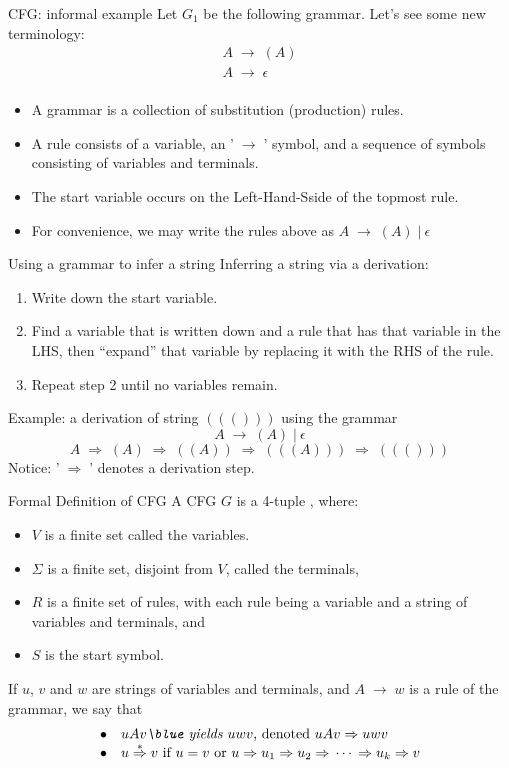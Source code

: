 \documentclass{prosper}%
\newcommand{\ra}{\mbox{$\;\rightarrow\;$}}
\newcommand{\vb}{\mbox{$\;|\:$}}
\newcommand{\dra}{\mbox{$\;\Rightarrow\;$}}
\newcommand{\cdra}{\mbox{$\;\stackrel{*}{\Rightarrow}\;$}}
\begin{document}
\begin{slide}{CFG: informal example}
Let $G_1$ be the following grammar. Let's see some new terminology:
\[
\begin{array}{l}
A \ra (A)\\
A\ra \epsilon\\
\end{array}
\]
\begin{itemize}
\item A {\blue grammar} is a collection of { substitution (production) rules}.
\item A {\blue rule} consists of a {\blue variable}, an '\ra' symbol, and a sequence of symbols consisting of variables and {\blue terminals}.
\item The {\blue start variable} occurs on the Left-Hand-Sside of the topmost rule.
\item For convenience, we may write the rules above as $A \ra (A)\vb \epsilon$
\end{itemize}
\end{slide}


\begin{slide}{Using a grammar to infer a string}
Inferring a string via a {\blue derivation}:
\begin{enumerate}
\item Write down the start variable.
\item Find  a variable that is written down and a rule that has that variable in the LHS,  then ``expand'' that variable by replacing it with the RHS of the rule.
\item Repeat step 2 until no variables remain.
\end{enumerate}
Example: a {\blue derivation} of string  $((()))$ using the grammar \[A\ra(A)\vb\epsilon\]
\[
A\dra(A)\dra((A))\dra(((A)))\dra((()))
\]
Notice: '\dra' denotes a derivation step.
\end{slide}

\begin{slide}{Formal Definition of CFG}
A CFG $G$ is a 4-tuple , where:
\begin{itemize}
\item $V$ is a finite set called the {\blue variables}.
\item $\Sigma$ is a finite set, disjoint from $V$, called the {\blue terminals},
\item $R$ is a finite set of {\blue rules}, with each rule being a variable and  a string of variables and terminals, and
\item $S$ is the start symbol.
\end{itemize}
If $u$, $v$ and $w$ are strings of variables and terminals, and $A\ra w$ is a rule of the grammar, we say that
\[
\begin{array}{ll}
\bullet & uAv\mbox{\em\blue\ yields }uwv\mbox{, denoted }uAv\dra uwv\\
\bullet & u\cdra v \mbox{\ if } u= v\mbox{\ or } u\dra u_1\dra u_2\dra\cdots\dra u_k\dra v
\end{array}
\]
\end{slide}
\end{document}
